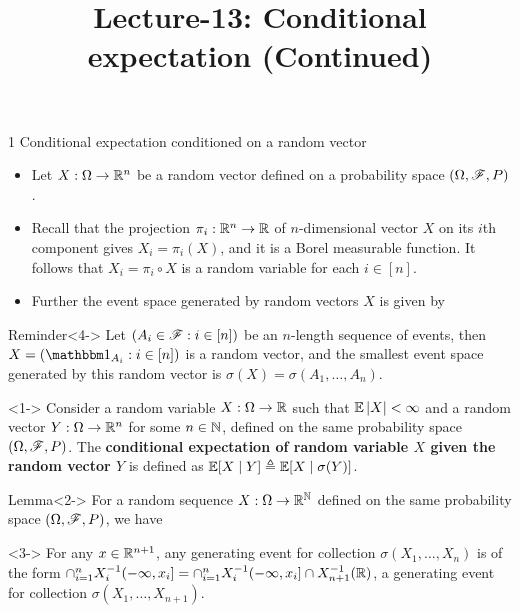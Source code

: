 \documentclass[12pt,aspectratio=169]{beamer}
\title{Lecture-13: Conditional expectation (Continued)}
\date{}
\begin{document}
\pagestyle{empty}
\maketitle


\begin{frame}{1 Conditional expectation conditioned on a random  vector}
\begin{itemize}
\item <1-> Let $X: \Omega \to \mathbb{R}^n$ be a random vector defined on a probability space $(\Omega, \mathscr{F}, P)$. 
\item <2-> Recall that the projection $\pi_i: \mathbb{R}^n \to \mathbb{R}$ of $n$-dimensional vector $X$ on its $i$th component gives $X_i = \pi_i(X)$, 
and it is a Borel measurable function. 
It follows that $X_i = \pi_i\circ X$ is a random variable for each $i \in [n]$. 
\item <3-> Further the event space generated by random vectors $X$ is given by 
\end{itemize}
\begin{block}{Reminder}<4->
Let $(A_i \in \mathscr{F}:  i \in [n])$ be an $n$-length sequence of events, 
then $X = (\Ind{A_i}: i \in [n])$ is a random vector, and the smallest event space generated by this random vector is $\sigma(X) = \sigma(A_1, \dots, A_n)$. 
\end{block}
\end{frame}

\begin{frame}
\begin{Definition}<1->
Consider a random variable $X:\Omega \to\mathbb{R}$ such that $\mathbb{E}\left\lvert X\right\rvert < \infty$ and a random vector $Y:\Omega \to \mathbb{R}^n$ for some $n\in \mathbb{N}$, 
defined on the same probability space $(\Omega, \mathscr{F}, P)$. 
The \textbf{conditional expectation of random variable $X$ given the random vector $Y$} is defined as $\mathbb{E}[X\mid Y] \triangleq \mathbb{E}[X\mid\sigma(Y)]$. 
\end{Definition}
\begin{block}{Lemma}<2->
For a random sequence $X: \Omega \to \mathbb{R}^{\mathbb{N}}$ defined on the same probability space $(\Omega, \mathscr{F}, P)$, 
we have 
\end{block}

\begin{Proof}<3->
For any $x \in \mathbb{R}^{n+1}$, 
any generating event for collection $\sigma(X_1, \dots, X_n)$ is of the form $\cap_{i=1}^nX_i^{-1}(-\infty, x_i] = \cap_{i=1}^nX_i^{-1}(-\infty, x_i]\cap X_{n+1}^{-1}(\mathbb{R})$, a generating event for collection $\sigma(X_1, \dots, X_{n+1})$.  
\end{Proof}
\end{frame}
\end{document}
